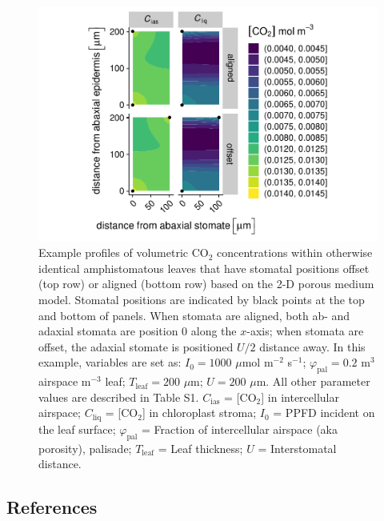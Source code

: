 \documentclass[
  letterpaper,
  DIV=11,
  numbers=noendperiod]{scrartcl}
\begin{document}
\begin{figure}

{\centering \includegraphics{figures/ph2d-example.pdf}

}

\caption{Example profiles of volumetric CO\(_2\) concentrations within
otherwise identical amphistomatous leaves that have stomatal positions
offset (top row) or aligned (bottom row) based on the 2-D porous medium
model. Stomatal positions are indicated by black points at the top and
bottom of panels. When stomata are aligned, both ab- and adaxial stomata
are position 0 along the \(x\)-axis; when stomata are offset, the
adaxial stomate is positioned \(U/2\) distance away. In this example,
variables are set as: \(I_0 = 1000\) \(\mu\)mol m\(^{-2}\) s\(^{-1}\);
\(\varphi_\text{pal} = 0.2\) m\(^3\) airspace m\(^{-3}\) leaf;
\(T_\text{leaf} = 200\) \(\mu\)m; \(U = 200\) \(\mu\)m. All other
parameter values are described in Table S1. \(C_\text{ias}\) =
{[}CO\(_2\){]} in intercellular airspace; \(C_\text{liq}\) =
{[}CO\(_2\){]} in chloroplast stroma; \(I_0\) = PPFD incident on the
leaf surface; \(\varphi_\text{pal}\) = Fraction of intercellular
airspace (aka porosity), palisade; \(T_\text{leaf}\) = Leaf thickness;
\(U\) = Interstomatal distance.}

\end{figure}

\newpage

\hypertarget{references}{%
\subsection*{References}\label{references}}
\end{document}
